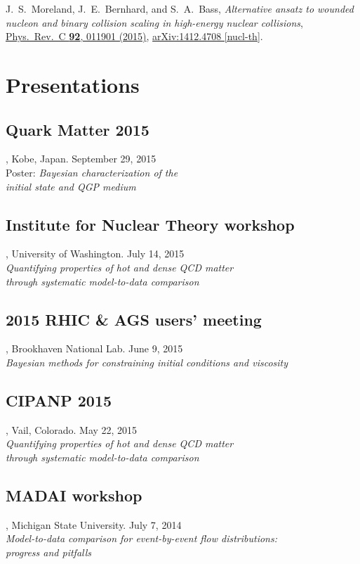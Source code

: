 \documentclass[letterpaper,10pt]{article}
\begin{document}
\vspace{1em}

J.~S.~Moreland, J.~E.~Bernhard, and S.~A.~Bass,
\emph{Alternative ansatz to wounded nucleon and binary collision scaling in high-energy nuclear collisions},
\href{http://dx.doi.org/10.1103/PhysRevC.92.011901}{Phys.\ Rev.\ C {\bf 92}, 011901 (2015)},
\href{http://arxiv.org/abs/1412.4708}{arXiv:1412.4708 [nucl-th]}.



\section{Presentations}


\subsection{Quark Matter 2015}, Kobe, Japan. \hfill September 29, 2015 \\
Poster: \emph{Bayesian characterization of the \\ initial state and QGP medium}

\subsection{Institute for Nuclear Theory workshop}, University of Washington. \hfill July 14, 2015 \\
\emph{Quantifying properties of hot and dense QCD matter \\ through systematic model-to-data comparison}

\subsection{2015 RHIC \& AGS users' meeting}, Brookhaven National Lab. \hfill June 9, 2015 \\
\emph{Bayesian methods for constraining initial conditions and viscosity}

\subsection{CIPANP 2015}, Vail, Colorado. \hfill May 22, 2015 \\
\emph{Quantifying properties of hot and dense QCD matter \\ through systematic model-to-data comparison}

\subsection{MADAI workshop}, Michigan State University. \hfill July 7, 2014 \\
\emph{Model-to-data comparison for event-by-event flow distributions: \\ progress and pitfalls}
\end{document}

